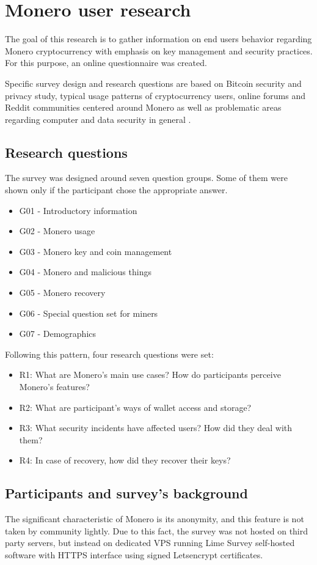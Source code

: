 \documentclass[
  printed, %
  table,   %
  lof,     %
  lot,     %
           oneside, color
]{fithesis3}
\begin{document}
\chapter{Monero user research}
\label{cha:monerousersurvey}
The goal of this research is to gather information on end users behavior regarding Monero cryptocurrency with emphasis on key management and security practices. For this purpose, an online questionnaire was created. 

Specific survey design and research questions are based on Bitcoin security and privacy study, typical usage patterns of cryptocurrency users, online forums and Reddit communities centered around Monero as well as problematic areas regarding computer and data security in general \cite{krombholz2016other}.
\section{Research questions}
The survey was designed around seven question groups. Some of them were shown only if the participant chose the appropriate answer.
\begin{itemize}\itemsep0em
\item G01 - Introductory information
\item G02 - Monero usage
\item G03 - Monero key and coin management
\item G04 - Monero and malicious things
\item G05 - Monero recovery
\item G06 - Special question set for miners
\item G07 - Demographics
\end{itemize}
Following this pattern, four research questions were set:
\begin{itemize}\itemsep0em
\item R1: What are Monero's main use cases? How do participants perceive Monero's features? 
\item R2: What are participant's ways of wallet access and storage?
\item R3: What security incidents have affected users? How did they deal with them?
\item R4: In case of recovery, how did they recover their keys?
\end{itemize}
\section{Participants and survey's background}
The significant characteristic of Monero is its anonymity, and this feature is not taken by community lightly. Due to this fact, the survey was not hosted on third party servers, but instead on dedicated VPS running Lime Survey self-hosted software with HTTPS interface using signed Letsencrypt certificates.
\end{document}
